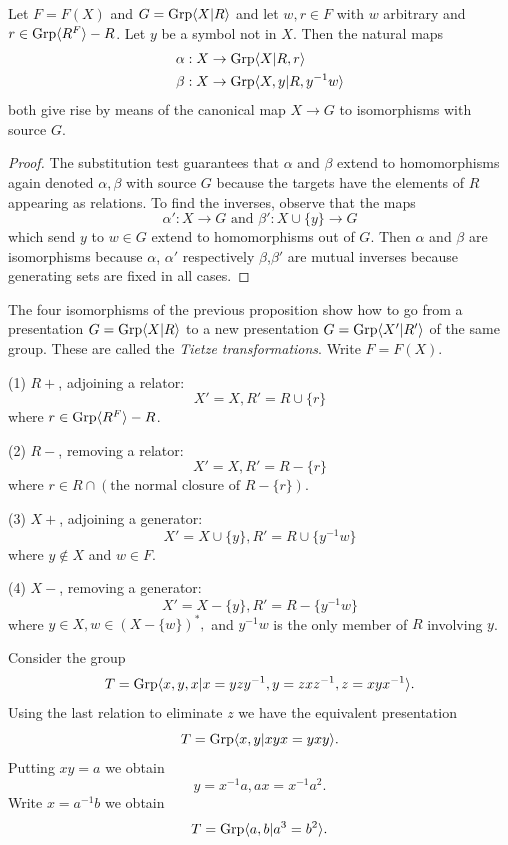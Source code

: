 \begin{prop} Let $F = F(X)$ and $G = \mathrm{Grp}\langle X|R\rangle$ and let $w,r\in F$ with $w$
    arbitrary and $r\in \mathrm{Grp}\langle R^F\rangle-R$. Let $y$ be a symbol not in $X$. Then the
    natural maps
\begin{align*}
    \alpha : X & \rightarrow \mathrm{Grp}\langle X|R,r\rangle\\
    \beta : X & \rightarrow \mathrm{Grp}\langle X,y|R,y^{-1}w\rangle
\end{align*} both give rise by means of the canonical map $X\rightarrow G$ to isomorphisms with source $G$.
\end{prop}
\begin{proof} The substitution test guarantees that $\alpha$ and $\beta$ extend
    to homomorphisms again denoted $\alpha, \beta$ with source $G$ because the
    targets have the elements of $R$ appearing as relations. To find the
    inverses, observe that the maps \[\alpha' : X \rightarrow G \text{ and }
    \beta' :X\cup \{y\} \rightarrow G \] which send $y$ to $w\in G$ extend to
    homomorphisms out of $G$. Then $\alpha$ and $\beta$ are isomorphisms
    because $\alpha$, $\alpha'$ respectively $\beta$,$\beta'$ are mutual
    inverses because generating sets are fixed in all cases.
\end{proof}

\begin{ap} The four isomorphisms of the previous proposition show how to go
    from a presentation $G=\mathrm{Grp}\langle X|R\rangle$ to a new presentation $G = \mathrm{Grp}\langle X'|R'\rangle$
    of the same group. These are called the \emph{Tietze transformations}.
    Write $F = F(X)$.

    (1) $R+$, adjoining a relator: \[X' = X, R' = R\cup \{r\}\] where $r\in \mathrm{Grp}\langle R^F\rangle-R$.

    (2) $R-$, removing a relator: \[X' = X, R' = R-\{r\}\] where $r\in R\cap (\text{the normal closure of } R -\{r\}).$  %

    (3) $X+$, adjoining a generator: \[X' = X\cup \{y\}, R' = R \cup \{y^{-1}w \}\] where $y\notin X$ and $w\in F$.

    (4) $X-$, removing a generator: \[X' = X-\{y\}, R' = R-\{y^{-1}w\}\] where $y\in X, w\in (X-\{w\})^*,$ and $y^{-1}w$ is the only member of $R$ involving $y$.
\end{ap}

\begin{eg} Consider the group \[T = \mathrm{Grp}\langle x,y,x|x = yzy^{-1}, y = zxz^{-1}, z =
    xyx^{-1}\rangle.\] Using the last relation to eliminate $z$ we have the
    equivalent presentation \[T = \mathrm{Grp}\langle x,y|xyx=yxy\rangle.\] Putting $xy=a$ we obtain
    \[y = x^{-1}a, ax = x^{-1}a^2.\] Write $x = a^{-1}b$ we obtain \[T =
    \mathrm{Grp}\langle a,b|a^3 = b^2\rangle.\]
\end{eg}

